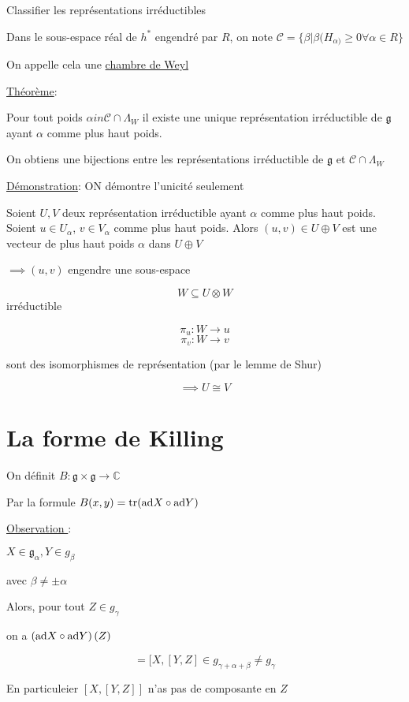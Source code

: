 Classifier les représentations irréductibles

Dans le sous-espace réal de \(h^{*}\) engendré par \(R\), on note \(\mathcal{C}= \{ \beta |  \beta(H_{\alpha)} \geq 0 \forall \alpha \in R\} \)

On appelle cela une \underline{chambre de Weyl} 


\underline{Théorème}: 

Pour tout poids \( \alpha in \mathcal{C} \cap \Lambda_W \) il existe une unique représentation irréductible de \(\mathfrak{g}\) ayant \(\alpha\) comme plus haut poids.

On obtiens une bijections entre les représentations irréductible de \(\mathfrak{g}\) et \(\mathcal{C} \cap \Lambda_W\)


\underline{Démonstration}: ON démontre l'unicité seulement 


Soient \(U, V\) deux représentation irréductible ayant \(\alpha \) comme plus haut poids. Soient \(u \in U_{\alpha} \), \(v \in V_\alpha \) comme plus haut poids. Alors \((u,v) \in U \oplus V\) est une vecteur de plus haut poids \(\alpha \) dans \(U \oplus V\)

\( \implies (u,v ) \) engendre une sous-espace 

\[ W \subseteq U \otimes W \] irréductible 


\[ \pi_{u} : W \to u \]
\[ \pi_v : W \to v \]

sont des isomorphismes de représentation (par le lemme de Shur) 


\[ \implies U \cong V \]

\section*{La forme de Killing}

On définit \(B: \mathfrak{g} \times \mathfrak{g} \to \mathds{C}\)

Par la formule \(B(x,y) = \tr( {\rm{}ad} X \circ {\rm{}ad}Y) \)

\underline{Observation }:

\(X \in \mathfrak{g}_\alpha , Y \in g_{\beta} \)

avec \(\beta \neq \pm \alpha\)

Alors, pour tout \(Z \in g_{\gamma} \)

on a \( \left( {\rm{}ad} X \circ {\rm{}ad} Y  \right) (Z)  \)

\[ = [X, [ Y, Z] \in g_{\gamma+\alpha+\beta} \neq g_{\gamma}  \]


En particuleier \( [X, [Y, Z] ]\) n'as pas de composante en \(Z\)

